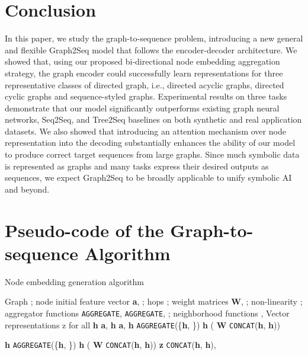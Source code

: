 \documentclass{article} \usepackage{iclr2019_conference,times}
\begin{document}
\section{Conclusion}
In this paper, we study the graph-to-sequence problem, introducing a new general and flexible Graph2Seq model that follows
the encoder-decoder architecture.
We showed that, using our proposed bi-directional node embedding aggregation strategy, the graph encoder could successfully learn representations for three representative classes of directed graph, i.e., directed acyclic graphs, directed cyclic graphs and sequence-styled graphs.
Experimental results on three tasks demonstrate that our model significantly outperforms existing graph neural networks, Seq2Seq, and Tree2Seq baselines on both synthetic and real application datasets.
We also showed that introducing an attention mechanism over node representation into the decoding substantially enhances the ability of our model to produce correct target sequences from large graphs.
Since much symbolic data is represented as graphs and many tasks express their desired outputs as sequences, we expect Graph2Seq to be broadly applicable to unify symbolic AI and beyond.




\clearpage
\newpage




\clearpage
\appendix
\section{Pseudo-code of the Graph-to-sequence Algorithm}
\begin{algorithm}[h]
\small
 \caption{\small Node embedding generation algorithm}
 \label{alg:node_embedding}
 \begin{algorithmic}[1]
 Graph ; node initial feature vector {\textbf{a}, };
        hops ; weight matrices \textbf{W}, ; non-linearity ;
        aggregator functions \texttt{\small AGGREGATE}, \texttt{\small AGGREGATE}, ;
        neighborhood functions ,  
 Vector representations z for all  
\STATE \textbf{h}  \textbf{a}, 
\STATE \textbf{h}  \textbf{a}, 
\FORALL{}
    \FORALL{}
    \STATE \textbf{h}  \texttt{AGGREGATE}(\{\textbf{h}, \})
    \STATE \textbf{h}   ( \textbf{W} \texttt{CONCAT}(\textbf{h}, \textbf{h}))
    
    \STATE \textbf{h}  \texttt{AGGREGATE}(\{\textbf{h}, \})
    \STATE \textbf{h}   ( \textbf{W} \texttt{CONCAT}(\textbf{h}, \textbf{h}))
    \ENDFOR
\ENDFOR
\STATE \textbf{z}  \texttt{CONCAT}(\textbf{h}, \textbf{h}), 
\end{algorithmic}
\end{algorithm}
\end{document}
